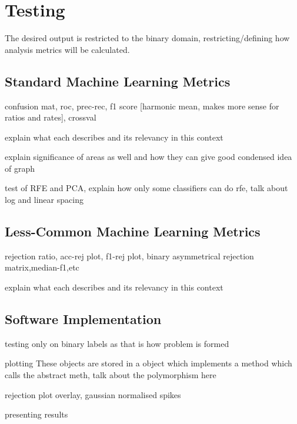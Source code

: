 \section{Testing}
\label{sec:pl-test}
    The desired output is restricted to the binary domain, restricting/defining how analysis metrics will be calculated.
    \subsection{Standard Machine Learning Metrics}
    \label{subsec:pl-test-stan}
        \begin{sitemize}
            \item{confusion mat, roc, prec-rec, f1 score [harmonic mean, makes more sense for ratios and rates], crossval}
            \item{explain what each describes and its relevancy in this context}
            \item{explain significance of areas as well and how they can give good condensed idea of graph}
            \item{test of RFE and PCA, explain how only some classifiers can do rfe, talk about log and linear spacing}
        \end{sitemize}
        
    \subsection{Less-Common Machine Learning Metrics}
    \label{subsec:pl-test-less}
        \begin{sitemize}
            \item{rejection ratio, acc-rej plot, f1-rej plot, binary asymmetrical rejection matrix,median-f1,etc}
            \item{explain what each describes and its relevancy in this context}
        \end{sitemize}
    
    \subsection{Software Implementation}
    \label{subsec:pl-test-software}
        \begin{sitemize}
            \item{testing only on binary labels as that is how problem is formed}
            \item{plotting
            These objects are stored in a  object which implements a  method which calls the abstract meth, talk about the polymorphism here}
            \item{rejection plot overlay, gaussian normalised spikes}
            \item{presenting results}
        \end{sitemize}